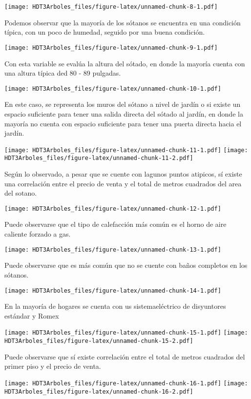 \documentclass[
]{article}
\begin{document}
\texttt{[image: HDT3Arboles\_files/figure-latex/unnamed-chunk-8-1.pdf]}

Podemos observar que la mayoría de los sótanos se encuentra en una
condición típica, con un poco de humedad, seguido por una buena
condición.

\texttt{[image: HDT3Arboles\_files/figure-latex/unnamed-chunk-9-1.pdf]}

Con esta variable se evalúa la altura del sótado, en donde la mayoría
cuenta con una altura típica ded 80 - 89 pulgadas.

\texttt{[image: HDT3Arboles\_files/figure-latex/unnamed-chunk-10-1.pdf]}

En este caso, se representa los muros del sótano a nivel de jardín o si
existe un espacio suficiente para tener una salida directa del sótado al
jardín, en donde la mayoría no cuenta con espacio suficiente para tener
una puerta directa hacia el jardín.

\texttt{[image: HDT3Arboles\_files/figure-latex/unnamed-chunk-11-1.pdf]}
\texttt{[image: HDT3Arboles\_files/figure-latex/unnamed-chunk-11-2.pdf]}

Según lo observado, a pesar que se cuente con lagunos puntos atipicos,
sí existe una correlación entre el precio de venta y el total de metros
cuadrados del area del sotano.

\texttt{[image: HDT3Arboles\_files/figure-latex/unnamed-chunk-12-1.pdf]}

Puede observarse que el tipo de calefacción más común es el horno de
aire caliente forzado a gas.

\texttt{[image: HDT3Arboles\_files/figure-latex/unnamed-chunk-13-1.pdf]}

Puede observarse que es más común que no se cuente con baños completos
en los sótanos.

\texttt{[image: HDT3Arboles\_files/figure-latex/unnamed-chunk-14-1.pdf]}

En la mayoría de hogares se cuenta con us sistemaeléctrico de
disyuntores estándar y Romex

\texttt{[image: HDT3Arboles\_files/figure-latex/unnamed-chunk-15-1.pdf]}
\texttt{[image: HDT3Arboles\_files/figure-latex/unnamed-chunk-15-2.pdf]}

Puede observarse que sí existe correlación entre el total de metros
cuadrados del primer piso y el precio de venta.

\texttt{[image: HDT3Arboles\_files/figure-latex/unnamed-chunk-16-1.pdf]}
\texttt{[image: HDT3Arboles\_files/figure-latex/unnamed-chunk-16-2.pdf]}
\end{document}
